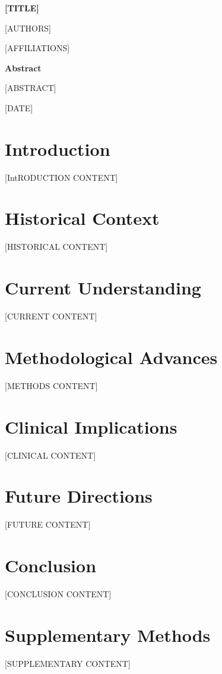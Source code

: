 \documentclass[12pt,a4paper]{article}
\begin{document}
\begin{titlepage}
\centering
\vspace*{2cm}

{\Huge\bfseries [TITLE]\par}

\vspace{1cm}

{\Large [AUTHORS]\par}

\vspace{0.5cm}

{\large [AFFILIATIONS]\par}

\vspace{2cm}

{\large\textbf{Abstract}\par}

\vspace{0.5cm}

{\large [ABSTRACT]\par}

\vspace{2cm}

{\large [DATE]\par}

\end{titlepage}

\tableofcontents
\newpage

\section{Introduction}
[IntRODUCTION CONTENT]

\section{Historical Context}
[HISTORICAL CONTENT]

\section{Current Understanding}
[CURRENT CONTENT]

\section{Methodological Advances}
[METHODS CONTENT]

\section{Clinical Implications}
[CLINICAL CONTENT]

\section{Future Directions}
[FUTURE CONTENT]

\section{Conclusion}
[CONCLUSION CONTENT]



\appendix
\section{Supplementary Methods}
[SUPPLEMENTARY CONTENT]
\end{document}
